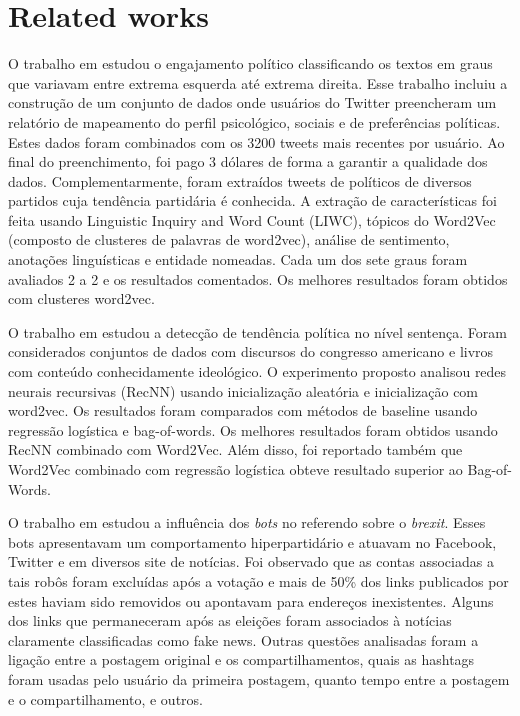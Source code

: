 \documentclass{llncs}
\begin{document}
	
	\section{Related works}
	\label{sec.related}
	
	O trabalho em \cite{Preotiuc-Pietro2017} estudou o engajamento político classificando os textos em graus que variavam entre extrema esquerda até extrema direita. Esse trabalho incluiu a construção de um conjunto de dados onde usuários do Twitter preencheram um relatório de mapeamento do perfil psicológico, sociais e de preferências políticas. Estes dados foram combinados com os 3200 tweets mais recentes por usuário. Ao final do preenchimento, foi pago 3 dólares de forma a garantir a qualidade dos dados. Complementarmente, foram extraídos tweets de políticos de diversos partidos cuja tendência partidária é conhecida.
	A extração de características foi feita usando Linguistic Inquiry and Word Count (LIWC), tópicos do Word2Vec (composto de clusteres de palavras de word2vec), análise de sentimento, anotações linguísticas e entidade nomeadas. Cada um dos sete graus foram avaliados 2 a 2 e os resultados comentados. Os melhores resultados foram obtidos com clusteres word2vec.
	
	O trabalho em \cite{Fallis2013} estudou a detecção de tendência política no nível sentença. Foram considerados conjuntos de dados com discursos do congresso americano e livros com conteúdo  conhecidamente ideológico.  O experimento proposto analisou redes neurais recursivas (RecNN) usando inicialização aleatória e inicialização com word2vec. Os resultados foram comparados com métodos de baseline usando regressão logística e  bag-of-words.  Os melhores resultados foram obtidos usando RecNN combinado com Word2Vec. Além disso, foi reportado também que Word2Vec combinado com regressão logística obteve resultado superior ao Bag-of-Words.
	
	O trabalho em \cite{Bastos2017} estudou a influência dos {\it bots} no referendo sobre o {\it brexit}. Esses bots apresentavam um comportamento hiperpartidário e atuavam no Facebook, Twitter e em diversos site de notícias. Foi observado que as contas associadas a tais robôs foram excluídas após a votação e mais de 50\% dos links publicados por estes haviam sido removidos ou apontavam para endereços inexistentes. Alguns dos links que permaneceram após as eleições foram associados à notícias claramente classificadas como fake news. Outras questões analisadas foram  a ligação entre a postagem original e os compartilhamentos,  quais as hashtags foram usadas pelo usuário da primeira postagem, quanto tempo entre a postagem e o compartilhamento, e outros.
	
\end{document}

